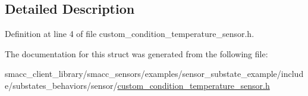 \subsection{Detailed Description}


Definition at line 4 of file custom\+\_\+condition\+\_\+temperature\+\_\+sensor.\+h.



The documentation for this struct was generated from the following file\+:\begin{DoxyCompactItemize}
\item 
smacc\+\_\+client\+\_\+library/smacc\+\_\+sensors/examples/sensor\+\_\+substate\+\_\+example/include/substates\+\_\+behaviors/sensor/\hyperlink{custom__condition__temperature__sensor_8h}{custom\+\_\+condition\+\_\+temperature\+\_\+sensor.\+h}\end{DoxyCompactItemize}

